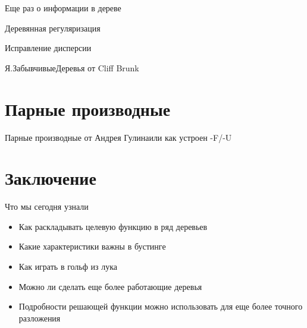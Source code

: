 \documentclass[14pt, fleqn, xcolor={dvipsnames, table}]{beamer}
\begin{document}
\begin{frame}{Еще раз о информации в дереве}
\end{frame}

\begin{frame}{Деревянная регуляризация}
\end{frame}

\begin{frame}{Исправление дисперсии}
\end{frame}

\begin{frame}{Я.ЗабывчивыеДеревья от Cliff Brunk}
\end{frame}

\section{Парные производные}

\begin{frame}{Парные производные от Андрея Гулина}{или как устроен -F/-U}
\end{frame}

\section{Заключение}

\begin{frame}{Что мы сегодня узнали}
\begin{itemize}
  \item Как раскладывать целевую функцию в ряд деревьев
  \item Какие характеристики важны в бустинге
  \item Как играть в гольф из лука
  \item Можно ли сделать еще более работающие деревья
  \item Подробности решающей функции можно использовать для еще более точного разложения
\end{itemize}
\end{frame}
\end{document}

